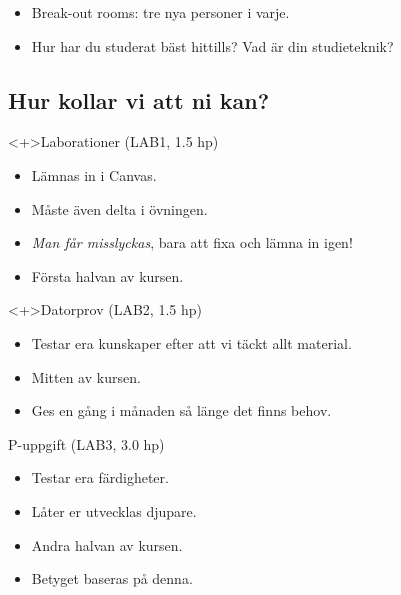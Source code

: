 \begin{frame}
  \begin{exercise}
    \begin{itemize}
      \item Break-out rooms: tre nya personer i varje.
      \item Hur har du studerat bäst hittills? Vad är din studieteknik?
    \end{itemize}
  \end{exercise}
\end{frame}

\subsection{Hur kollar vi att ni kan?}

\begin{frame}
  \begin{block}<+>{Laborationer (LAB1, 1.5 hp)}
    \begin{itemize}
      \item Lämnas in i Canvas.
      \item Måste även delta i övningen.
      \item \emph{Man får misslyckas}, bara att fixa och lämna in igen!
      \item Första halvan av kursen.
    \end{itemize}
  \end{block}

  \pause

  \begin{block}<+>{Datorprov (LAB2, 1.5 hp)}
    \begin{itemize}
      \item Testar era kunskaper efter att vi täckt allt material.
      \item Mitten av kursen.
      \item Ges en gång i månaden så länge det finns behov.
    \end{itemize}
  \end{block}
\end{frame}

\begin{frame}
  \begin{block}{P-uppgift (LAB3, 3.0 hp)}
    \begin{itemize}
      \item Testar era färdigheter.
      \item Låter er utvecklas djupare.
      \item Andra halvan av kursen.
      \item Betyget baseras på denna.
    \end{itemize}
  \end{block}
\end{frame}

